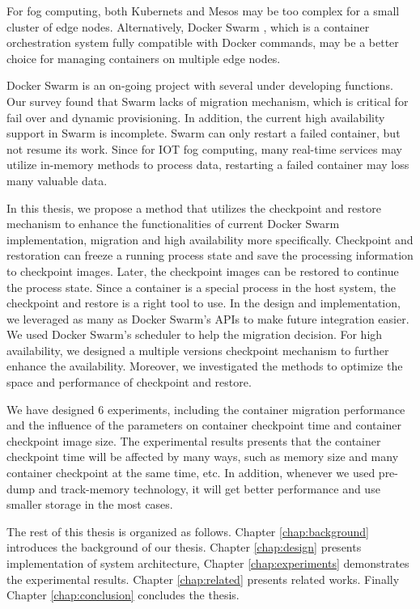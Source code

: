 For fog computing, both Kubernets and Mesos may be too complex for a small cluster of edge nodes.  Alternatively, Docker Swarm {\color{red} \cite{DockerSwarm}}, which is a container orchestration system fully compatible with Docker commands, may be a better choice for managing containers on multiple edge nodes.

Docker Swarm is an on-going project with several under developing functions.  Our survey found that Swarm lacks of migration mechanism, which is critical for fail over and dynamic provisioning.  In addition, the current high availability support in Swarm is incomplete.  Swarm can only restart a failed container, but not resume its work.  Since for IOT fog computing, many real-time services may utilize in-memory methods to process data, restarting a failed container may loss many valuable data.

In this thesis, we propose a method that utilizes the checkpoint and restore mechanism to enhance the functionalities of current Docker Swarm implementation, migration and high availability more specifically.  Checkpoint and restoration \cite{Bhattiprolu:2008:VSC:1400097.1400109} can freeze a running process state and save the processing information to checkpoint images. Later, the checkpoint images can be restored to continue the process state.  Since a container is a special process in the host system, the checkpoint and restore is a right tool to use. In the design and implementation, we leveraged as many as Docker Swarm's APIs to make future integration easier.  We used Docker Swarm's scheduler to help the migration decision.  For high availability, we designed a multiple versions checkpoint mechanism to further enhance the availability.  Moreover, we investigated the methods to optimize the space and performance of checkpoint and restore.

{\color{red} We have designed 6 experiments, including the container migration performance and the influence of the parameters on container checkpoint time and container checkpoint image size.  The experimental results presents that the container checkpoint time will be affected by many ways, such as memory size and many container checkpoint at the same time, etc.  In addition, whenever we used pre-dump and track-memory technology, it will get better performance and use smaller storage in the most cases.}

{\color{red} The rest of this thesis is organized as follows.  Chapter \ref{chap:background} introduces the background of our thesis.  Chapter \ref{chap:design} presents implementation of system architecture,  Chapter \ref{chap:experiments} demonstrates the experimental results.  Chapter \ref{chap:related} presents related works.  Finally Chapter \ref{chap:conclusion} concludes the thesis. }